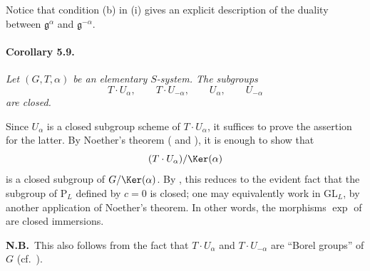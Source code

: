 Notice that condition \textup{(b)} in \textup{(i)} gives an explicit
description of the duality between
\(\mathfrak g^\alpha\) and \(\mathfrak g^{-\alpha}\).

\paragraph{\textbf{Corollary 5.9.}}
\emph{Let \((G,T,\alpha)\) be an elementary \(S\)-system.  The
subgroups}
\[
 T\cdot U_\alpha,\qquad T\cdot U_{-\alpha},
 \qquad U_\alpha,\qquad U_{-\alpha}
\]
\emph{are closed.}

Since \(U_\alpha\) is a closed subgroup scheme of
\(T\cdot U_\alpha\), it suffices to prove the assertion for the
latter.  By Noether's theorem \textup{( and )},
it is enough to show that
\[
 (T\cdot U_\alpha)/\Ker(\alpha)
\]
is a closed subgroup of \(G/\Ker(\alpha)\).  By , this reduces to
the evident fact that the subgroup of \(\mathrm P_L\) defined by
\(c=0\) is closed; one may equivalently work in \(\mathrm{GL}_L\),
by another application of Noether's theorem.  In other words, the
morphisms \(\exp\) of  are closed
immersions.

\smallskip
\noindent\textbf{N.B.}\ This also follows from the fact that
\(T\cdot U_\alpha\) and \(T\cdot U_{-\alpha}\) are ``Borel
groups'' of \(G\) \textup{(cf.\ )}.

